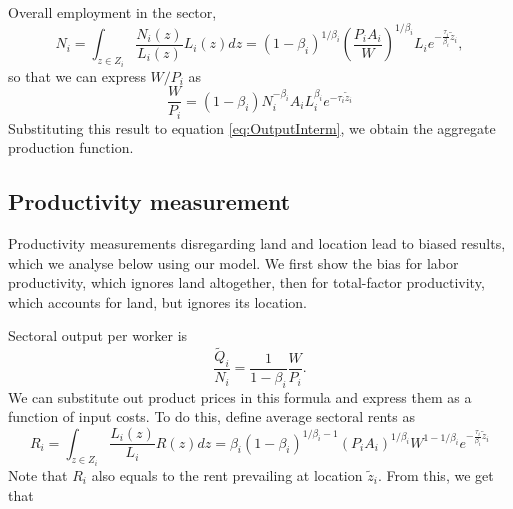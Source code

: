 \documentclass[12pt]{article}
\begin{document}
Overall employment in the sector,
\[
N_i = \int_{z\in Z_i}\frac{N_i(z)}{L_i(z)}L_i(z)dz= (1-\beta_i)^{1/\beta_i}
\left(\frac{P_iA_i}{W}\right)^{1/\beta_i} L_i e^{-\frac{\tau_i}{\beta_i} \tilde z_i},
\]
so that we can express $W/P_i$ as
\[
\frac{W}{P_i} = (1-\beta_i)
N_i^{-\beta_i}A_i L_i^{\beta_i}
 e^{-\tau_i\tilde z_i}
\]
Substituting this result to equation \ref{eq:OutputInterm}, we obtain the aggregate production function. 

\subsection{Productivity measurement}
Productivity measurements disregarding land and location lead to biased results, which we analyse below using our model. We first show the bias for labor productivity, which ignores land altogether, then for total-factor productivity, which accounts for land, but ignores its location.


Sectoral output per worker is
\[
\frac{\tilde Q_i}{N_i} = \frac1{1-\beta_i}
\frac{W}{P_i}.
\]
We can substitute out product prices in this formula and express them as a function of input costs. To do this, define average sectoral rents as
\begin{equation}
R_i =\int_{z\in Z_i}\frac{L_i(z)}{L_i}R(z)dz = \beta_i(1-\beta_i)^{1/\beta_i-1} \left(P_iA_i\right)^{1/\beta_i} W^{1-1/\beta_i} e^{-\frac{\tau_i}{\beta_i} \tilde{z}_i}
\end{equation}
Note that $R_i$ also equals to the rent prevailing at location $\tilde z_i$. From this, we get that 
\end{document}
